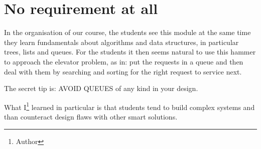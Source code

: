 
\section{No requirement at all}

In the organisation of our course, the students see this module at the
same time they learn fundamentals about algorithms and data
structures, in particular trees, lists and queues. For the students it
then seems natural to use this hammer to approach the elevator
problem, as in: put the requests in a queue and then deal with them by
searching and sorting for the right request to service next. 

The secret tip is: AVOID QUEUES of any kind in your design.  

What I\footnote{Author} learned in particular is that students tend to
build complex systems and than counteract design flaws with other
smart solutions.


